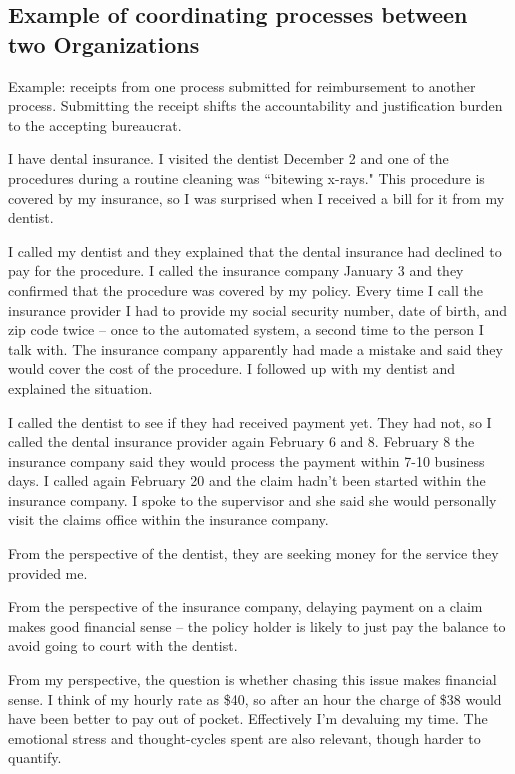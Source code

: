 \subsection*{Example of coordinating processes between two Organizations}
Example: receipts from one process submitted for reimbursement to another process.
Submitting the receipt shifts the accountability and justification burden to the accepting bureaucrat.




I have dental insurance. I visited the dentist December 2 and one of the procedures during a routine cleaning was ``bitewing x-rays." This procedure is covered by my insurance, so I was surprised when I received a bill for it from my dentist.

I called my dentist and they explained that the dental insurance had declined to pay for the procedure. I called the insurance company January 3 and they confirmed that the procedure was covered by my policy. 
Every time I call the insurance provider I had to provide my social security number, date of birth, and zip code twice -- once to the automated system, a second time to the person I talk with. The insurance company apparently had made a mistake and said they would cover the cost of the procedure. I followed up with my dentist and explained the situation.

I called the dentist to see if they had received payment yet. They had not, so I called the dental insurance provider again February 6 and 8. February 8 the insurance company said they would process the payment within 7-10 business days. I called again February 20 and the claim hadn't been started within the insurance company. I spoke to the supervisor and she said she would personally visit the claims office within the insurance company.

From the perspective of the dentist, they are seeking money for the service they provided me.

From the perspective of the insurance company, delaying payment on a claim makes good financial sense -- the policy holder is likely to just pay the balance to avoid going to court with the dentist.

From my perspective, the question is whether chasing this issue makes financial sense. I think of my hourly rate as \$40, so after an hour the charge of \$38 would have been better to pay out of pocket. Effectively I'm devaluing my time. The emotional stress and thought-cycles spent are also relevant, though harder to quantify.

